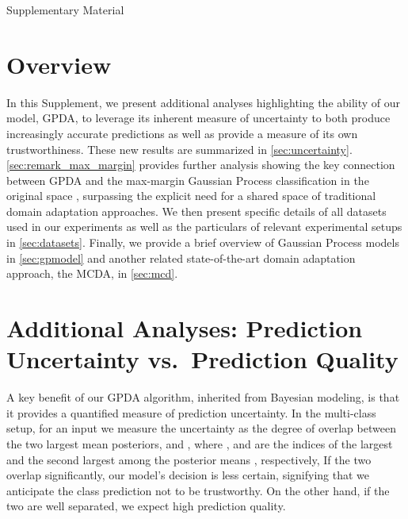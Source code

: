 \documentclass[10pt,letterpaper]{article}
\begin{document}
\appendix













\newpage

\begin{center}
\LARGE Supplementary Material
\end{center}

\section{Overview}
In this Supplement, we present additional analyses highlighting the ability of our model, GPDA, to leverage its inherent measure of uncertainty to both produce increasingly accurate predictions as well as provide a measure of its own trustworthiness. These new results are summarized in \autoref{sec:uncertainty}.  \autoref{sec:remark_max_margin} provides further analysis showing the key connection between GPDA and the max-margin Gaussian Process classification in the original space , surpassing the explicit need for a shared space  of traditional domain adaptation approaches.  We then present specific details of all datasets used in our experiments as well as the particulars of relevant experimental setups in \autoref{sec:datasets}.  Finally, we provide a brief overview of Gaussian Process models in \autoref{sec:gpmodel} and another related state-of-the-art domain adaptation approach, the MCDA, in \autoref{sec:mcd}.

\section{Additional Analyses: Prediction Uncertainty vs.~Prediction Quality}\label{sec:uncertainty}

A key benefit of our GPDA algorithm, inherited from Bayesian modeling, is that it provides a quantified measure of prediction uncertainty. In the multi-class setup, for an input  we  measure the uncertainty as the degree of overlap between the two largest mean posteriors,   and , where ,  and  are the indices of the largest and the second largest among the posterior means , respectively, 
If the two overlap significantly, our model's decision is less certain, signifying that we anticipate the class prediction not to be trustworthy. On the other hand, if the two are well separated, we expect high prediction quality.\\
\end{document}

